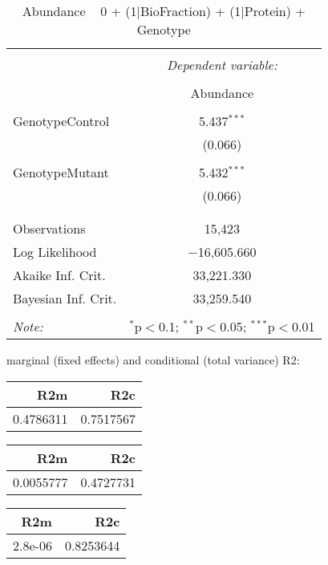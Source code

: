 \documentclass[11pt]{report}
\begin{document}
\begin{table}[!htbp] \centering 
  \caption{Abundance ~ 0 + (1|BioFraction) + (1|Protein) + Genotype} 
  \label{} 
\begin{tabular}{@{\extracolsep{5pt}}lc} 
\\[-1.8ex]\hline 
\hline \\[-1.8ex] 
 & \multicolumn{1}{c}{\textit{Dependent variable:}} \\ 
\cline{2-2} 
\\[-1.8ex] & Abundance \\ 
\hline \\[-1.8ex] 
 GenotypeControl & 5.437$^{***}$ \\ 
  & (0.066) \\ 
  & \\ 
 GenotypeMutant & 5.432$^{***}$ \\ 
  & (0.066) \\ 
  & \\ 
\hline \\[-1.8ex] 
Observations & 15,423 \\ 
Log Likelihood & $-$16,605.660 \\ 
Akaike Inf. Crit. & 33,221.330 \\ 
Bayesian Inf. Crit. & 33,259.540 \\ 
\hline 
\hline \\[-1.8ex] 
\textit{Note:}  & \multicolumn{1}{r}{$^{*}$p$<$0.1; $^{**}$p$<$0.05; $^{***}$p$<$0.01} \\ 
\end{tabular} 
\end{table} 
marginal (fixed effects) and conditional (total variance) R2:

\begin{tabular}{r|r}
\hline
R2m & R2c\\
\hline
0.4786311 & 0.7517567\\
\hline
\end{tabular}

\begin{tabular}{r|r}
\hline
R2m & R2c\\
\hline
0.0055777 & 0.4727731\\
\hline
\end{tabular}

\begin{tabular}{r|r}
\hline
R2m & R2c\\
\hline
2.8e-06 & 0.8253644\\
\hline
\end{tabular}
\end{document}
